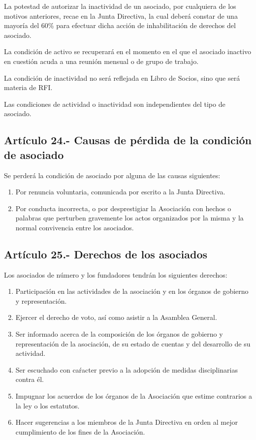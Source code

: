 \documentclass[10pt, spanish, pdftex]{gulplantilla}
\begin{document}
La potestad de autorizar la inactividad de un asociado, por cualquiera de los motivos anteriores, recae en la Junta Directiva, la cual deberá constar de una mayoría del 60\% para efectuar dicha acción de inhabilitación de derechos del asociado.

La condición de activo se recuperará en el momento en el que el asociado inactivo en cuestión acuda a una reunión mensual o de grupo de trabajo.

La condición de inactividad no será reflejada en Libro de Socios, sino que será materia de RFI.

Las condiciones de actividad o inactividad son independientes del tipo de asociado.

\subsection{Artículo 24.- Causas de pérdida de la condición de asociado}
Se perderá la condición de asociado por alguna de las causas siguientes:
\begin{enumerate}[label=\alph*)]
    \item Por renuncia voluntaria, comunicada por escrito a la Junta Directiva.
    \item Por conducta incorrecta, o por desprestigiar la Asociación con hechos o palabras que perturben gravemente los actos organizados por la misma y la normal convivencia entre los asociados.
\end{enumerate}

\subsection{Artículo 25.- Derechos de los asociados}
Los asociados de número y los fundadores tendrán los siguientes derechos:
\begin{enumerate}[label=\alph*)]
    \item Participación en las actividades de la asociación y en los órganos de gobierno y representación.
    \item Ejercer el derecho de voto, así como asistir a la Asamblea General.
    \item Ser informado acerca de la composición de los órganos de gobierno y representación de la asociación, de su estado de cuentas y del desarrollo de su actividad.
    \item Ser escuchado con caŕacter previo a la adopción de medidas disciplinarias contra él.
    \item Impugnar los acuerdos de los órganos de la Asociación que estime contrarios a la ley o los estatutos.
    \item Hacer sugerencias a los miembros de la Junta Directiva en orden al mejor cumplimiento de los fines de la Asociación.
\end{enumerate}
\end{document}
